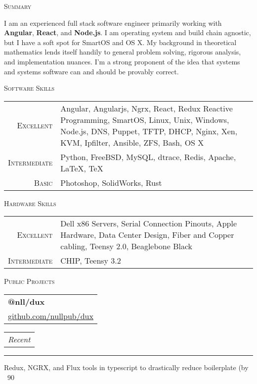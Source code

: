 \documentclass{article}
\makeatletter
\newcommand{\split}[3]{
\noindent\begin{tabular}[t]{@{}l}
    \textbf{#1} \\ #2
\end{tabular}
\hfill
\begin{tabular}[t]{l@{}}
    \\
    \textit{#3}
\end{tabular}
\noindent\rule{\columnwidth}{0.5pt}
}
\newcommand{\sub}[1]{
    {\raggedleft
        \large{\textsc{\color{OliveGreen}#1}}\par
    }
}
\makeatother
\begin{document}
\begin{multicols}{2}
\iffalse

\split{GoDaddy.com}{Data Center Engineer}{Aug 2007 -- Aug 2010}
Was responsible for the build out and maintenance of \textbf{enterprise level data centers}. \textbf{Trained} junior technicians. \textbf{Headed critical deployments} for the data center team. Acted as the \textbf{final tier of customer support}. Created and maintained the data center team \textbf{knowledge base}.

\split{Magenta Computer}{Technician}{Aug 2001 -- Aug 2004}
\textbf{Server manufacturing}, hardware and software \textbf{troubleshooting}, and \textbf{data recovery}. I cut my teeth here on everything from Intel's 486DX2 to the first Xeons and beyond.
\fi

\columnbreak

\sub{Summary}
I am an experienced full stack software engineer primarily working with \textbf{Angular}, \textbf{React}, and \textbf{Node.js}. I am operating system and build chain agnostic, but I have a soft spot for SmartOS and OS X. My background in theoretical mathematics lends itself handily to general problem solving, rigorous analysis, and implementation nuances. I'm a strong proponent of the idea that systems and systems software can and should be provably correct.

\sub{Software Skills}
\begin{tabular}{r|p{61mm}}
\textsc{Excellent} & Angular, Angularjs, Ngrx, React, Redux Reactive Programming, SmartOS, Linux, Unix, Windows, Node.js, DNS, Puppet, TFTP, DHCP, Nginx, Xen, KVM, Ipfilter, Ansible, ZFS, Bash, OS X \\
\textsc{Intermediate} & Python, FreeBSD, MySQL, dtrace, Redis, Apache, \LaTeX, \TeX \\
\textsc{Basic} & Photoshop, SolidWorks, Rust
\end{tabular}

\sub{Hardware Skills}
\begin{tabular}{r|p{61mm}}
\textsc{Excellent} & Dell x86 Servers, Serial Connection Pinouts, Apple Hardware, Data Center Design, Fiber and Copper cabling, Teensy 2.0, Beaglebone Black \\
\textsc{Intermediate} & CHIP, Teensy 3.2
\end{tabular}

\sub{Public Projects}
\split{@nll/dux}{\href{https://github.com/nullpub/dux}{github.com/nullpub/dux}}{Recent}
Redux, NGRX, and Flux tools in typescript to drastically reduce boilerplate (by ~90%


\end{multicols}
\end{document}
